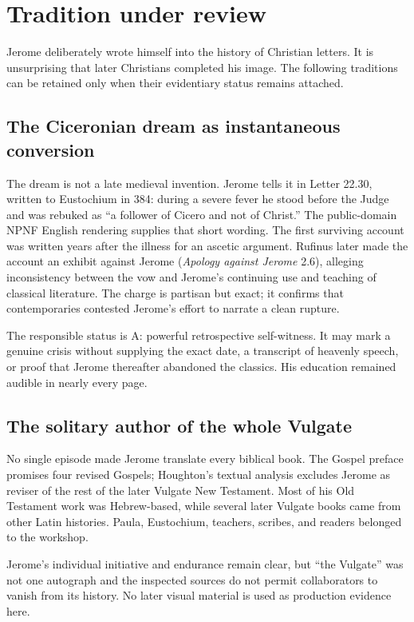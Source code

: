 \section{Tradition under review}\label{sec:jerome-tradition}

Jerome deliberately wrote himself into the history of Christian letters. It is
unsurprising that later Christians completed his image. The following
traditions can be retained only when their evidentiary status remains attached.

\subsection{The Ciceronian dream as instantaneous conversion}

The dream is not a late medieval invention. Jerome tells it in Letter 22.30,
written to Eustochium in 384: during a severe fever he stood before the Judge
and was rebuked as “a follower of Cicero and not of Christ.” The public-domain
NPNF English rendering supplies that short wording. The
first surviving account was written years after the illness for an ascetic
argument. Rufinus later made the account an exhibit against Jerome
(\emph{Apology against Jerome} 2.6), alleging inconsistency between the vow and
Jerome's continuing use and teaching of classical literature. The charge is
partisan but exact; it confirms that contemporaries contested Jerome's effort
to narrate a clean rupture.

The responsible status is A: powerful retrospective self-witness. It may mark
a genuine crisis without supplying the exact date, a transcript of heavenly
speech, or proof that Jerome thereafter abandoned the classics. His education
remained audible in nearly every page.

\subsection{The solitary author of the whole Vulgate}

No single episode made Jerome translate every biblical book. The Gospel
preface promises four revised Gospels; Houghton's textual analysis excludes
Jerome as reviser of the rest of the later Vulgate New Testament. Most of his
Old Testament work was Hebrew-based, while several later Vulgate books came
from other Latin histories. Paula, Eustochium, teachers, scribes, and readers
belonged to the workshop.

Jerome's individual initiative and endurance remain clear, but ``the Vulgate''
was not one autograph and the inspected sources do not permit collaborators to
vanish from its history. No later visual material is used as production
evidence here.

